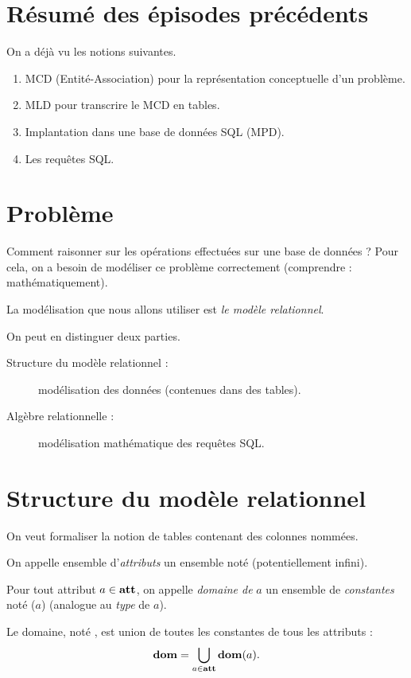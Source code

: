 \section{Résumé des épisodes précédents}

On a déjà vu les notions suivantes.
\begin{enumerate}
\item MCD (Entité-Association) pour la représentation conceptuelle d'un problème.
\item MLD pour transcrire le MCD en tables.
\item Implantation dans une base de données SQL (MPD).
\item Les requêtes SQL.
\end{enumerate}


\section{Problème}

Comment raisonner sur les opérations effectuées sur une base de
données ? Pour cela, on a besoin de  modéliser  ce problème correctement
(comprendre : mathématiquement).

La modélisation que nous allons utiliser est \emph{le modèle relationnel}.

On peut en distinguer deux parties.
\begin{description}
\item[Structure du modèle relationnel :] modélisation des données (contenues dans des tables).
\item[Algèbre relationnelle :] modélisation mathématique des requêtes SQL.
\end{description}

\section{Structure du modèle relationnel}

On veut formaliser la notion de tables contenant des colonnes nommées.

\begin{defi}
  On appelle  ensemble d'\emph{attributs} un ensemble noté \att{} (potentiellement infini).

  Pour tout attribut $a\in\mathbf{att}$, on appelle \emph{domaine de }$a$ un ensemble de
  \emph{constantes} noté \dom($a$) (analogue au \emph{type} de $a$).

  Le domaine, noté \dom{}, est union de toutes les constantes de tous les attributs : 
  \begin{equation*}
    \mathbf{dom} = \bigcup_{a \in \mathbf{att}} \mathbf{dom}(a).
  \end{equation*}
\end{defi}


